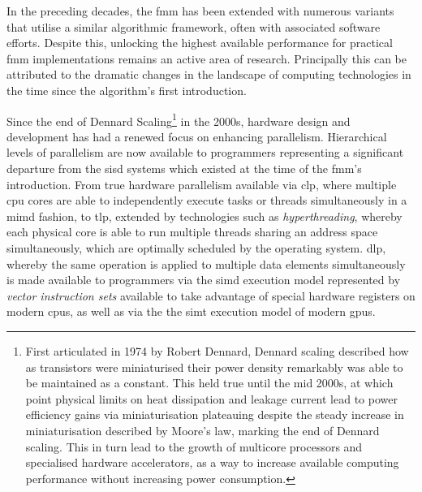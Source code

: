 In the preceding decades, the \acrshort{fmm} has been extended with numerous variants that utilise a similar algorithmic framework, often with associated software efforts. Despite this, unlocking the highest available performance for practical \acrshort{fmm} implementations remains an active area of research. Principally this can be attributed to the dramatic changes in the landscape of computing technologies in the time since the algorithm's first introduction.

Since the end of Dennard Scaling\footnote{First articulated in 1974 by Robert Dennard, Dennard scaling described how as transistors were miniaturised their power density remarkably was able to be maintained as a constant. This held true until the mid 2000s, at which point physical limits on heat dissipation and leakage current lead to power efficiency gains via miniaturisation plateauing despite the steady increase in miniaturisation described by Moore's law, marking the end of Dennard scaling. This in turn lead to the growth of multicore processors and specialised hardware accelerators, as a way to increase available computing performance without increasing power consumption.} in the 2000s, hardware design and development has had a renewed focus on enhancing parallelism. Hierarchical levels of parallelism are now available to programmers representing a significant departure from the \acrfull{sisd} systems which existed at the time of the \acrshort{fmm}'s introduction. From true hardware parallelism available via \acrfull{clp}, where multiple \acrfull{cpu} cores are able to independently execute tasks or threads simultaneously in a \acrfull{mimd} fashion, to \acrfull{tlp}, extended by technologies such as \textit{hyperthreading}, whereby each physical core is able to run multiple threads sharing an address space simultaneously, which are optimally scheduled by the operating system. \acrfull{dlp}, whereby the same operation is applied to multiple data elements simultaneously is made available to programmers via the \acrfull{simd} execution model represented by \textit{vector instruction sets} available to take advantage of special hardware registers on modern \glspl{cpu}, as well as via the the \acrfull{simt} execution model of modern \glspl{gpu}.

